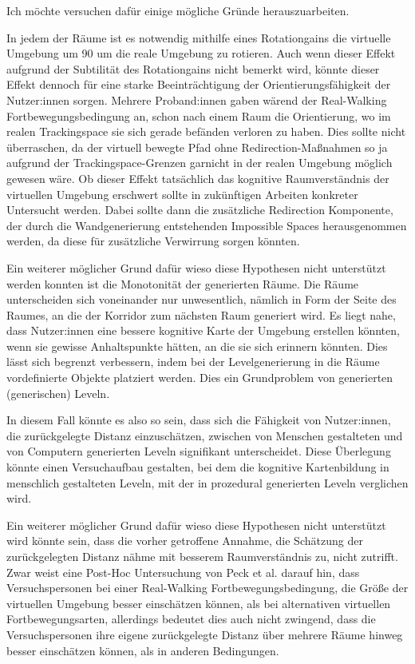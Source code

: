             Ich möchte versuchen dafür einige mögliche Gründe herauszuarbeiten.

            In jedem der Räume ist es notwendig mithilfe eines Rotationgains die virtuelle Umgebung um
            90\textdegree
            um die reale Umgebung zu rotieren. Auch wenn dieser Effekt aufgrund der Subtilität des Rotationgains nicht bemerkt wird, könnte dieser Effekt dennoch für eine starke Beeinträchtigung der Orientierungsfähigkeit der Nutzer:innen sorgen. Mehrere Proband:innen gaben wärend der Real-Walking Fortbewegungsbedingung an, schon nach einem Raum die Orientierung, wo im realen Trackingspace sie sich gerade befänden verloren zu haben. Dies sollte nicht überraschen, da der virtuell bewegte Pfad ohne Redirection-Maßnahmen so ja aufgrund der Trackingspace-Grenzen garnicht in der realen Umgebung möglich gewesen wäre. Ob dieser Effekt tatsächlich das kognitive Raumverständnis der virtuellen Umgebung erschwert sollte in zukünftigen Arbeiten konkreter Untersucht werden. Dabei sollte dann die zusätzliche Redirection Komponente, der durch die Wandgenerierung entstehenden Impossible Spaces herausgenommen werden, da diese für zusätzliche Verwirrung sorgen könnten.

            Ein weiterer möglicher Grund dafür wieso diese Hypothesen nicht unterstützt werden konnten ist die Monotonität der generierten Räume.
            Die Räume unterscheiden sich voneinander nur unwesentlich, nämlich in Form der Seite des Raumes, an die der Korridor zum nächsten Raum generiert wird. Es liegt nahe, dass Nutzer:innen eine bessere kognitive Karte der Umgebung erstellen könnten, wenn sie gewisse Anhaltspunkte hätten, an die sie sich erinnern könnten. Dies lässt sich begrenzt verbessern, indem bei der Levelgenerierung in die Räume vordefinierte Objekte platziert werden. Dies ein Grundproblem von generierten (generischen) Leveln.

            In diesem Fall könnte es also so sein, dass sich die Fähigkeit von Nutzer:innen, die zurückgelegte Distanz einzuschätzen, zwischen von Menschen gestalteten und von Computern generierten Leveln signifikant unterscheidet. Diese Überlegung könnte einen Versuchaufbau gestalten, bei dem die kognitive Kartenbildung in menschlich gestalteten Leveln, mit der in prozedural generierten Leveln verglichen wird.

            Ein weiterer möglicher Grund dafür wieso diese Hypothesen nicht unterstützt wird könnte sein, dass die vorher getroffene Annahme, die Schätzung der zurückgelegten Distanz nähme mit besserem Raumverständnis zu, nicht zutrifft.
            Zwar weist eine Post-Hoc Untersuchung von Peck et al. \cite{peck-vergleich-2011} darauf hin, dass Versuchspersonen bei einer Real-Walking Fortbewegungsbedingung, die Größe der virtuellen Umgebung besser einschätzen können, als bei alternativen virtuellen Fortbewegungsarten, allerdings bedeutet dies auch nicht zwingend, dass die Versuchspersonen ihre eigene zurückgelegte Distanz über mehrere Räume hinweg besser einschätzen können, als in anderen Bedingungen.


